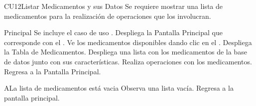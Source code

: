 \begin{UseCase}{CU12}{Listar Medicamentos y sus Datos}{
		Se requiere mostrar una lista de medicamentos para la realización de operaciones que los involucran.
	}
	\end{UseCase}
	\begin{UCtrayectoria}{Principal}
		\UCpaso Se incluye el caso de uso .
		\UCpaso Despliega la  {Pantalla Principal} que corresponde con el \UCactor.
		\UCpaso[\UCactor] Ve los medicamentos disponibles dando clic en el .
		\UCpaso Despliega la  {Tabla de Medicamentos}.
		\UCpaso Despliega una lista con los medicamentos de la base de datos junto con sus características.
		\UCpaso[\UCactor] Realiza operaciones con los medicamentos.
		\UCpaso [\UCactor] Regresa a la  {Pantalla Principal}.
	
	\end{UCtrayectoria}


		\begin{UCtrayectoriaA}{A}{La lista de medicamentos está vacia}
			\UCpaso[\UCactor] Observa una lista vacía.
			\UCpaso[\UCactor] Regresa a la pantalla principal.
		\end{UCtrayectoriaA}

